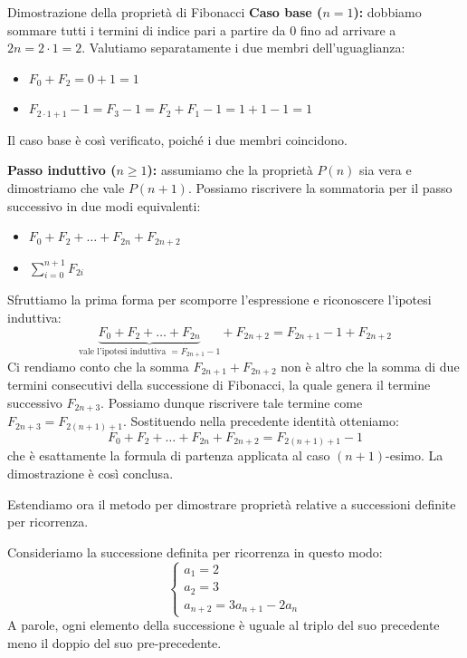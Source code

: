 \documentclass[12pt]{report}
\begin{document}
	\begin{dimostrazione}{Dimostrazione della proprietà di Fibonacci}{}
		\textbf{Caso base ($n=1$):} dobbiamo sommare tutti i termini di indice pari a partire da $0$ fino ad arrivare a $2n = 2\cdot 1 = 2$.
		Valutiamo separatamente i due membri dell'uguaglianza:
		\begin{itemize}
			\item $F_0 + F_2 = 0 + 1 = 1$
			\item $F_{2\cdot 1 + 1} - 1 = F_3 - 1 = F_2 + F_1 - 1 = 1 + 1 - 1 = 1$
		\end{itemize}
		Il caso base è così verificato, poiché i due membri coincidono.
		
		\textbf{Passo induttivo ($n \ge 1$):} assumiamo che la proprietà $P(n)$ sia vera e dimostriamo che vale $P(n+1)$.
		Possiamo riscrivere la sommatoria per il passo successivo in due modi equivalenti:
		\begin{itemize}
			\item $F_0 + F_2 + \dots + F_{2n} + F_{2n+2}$
			\item $\sum_{i=0}^{n+1} F_{2i}$
		\end{itemize}
		Sfruttiamo la prima forma per scomporre l'espressione e riconoscere l'ipotesi induttiva:
		\[
		\underbrace{F_0 + F_2 + \dots + F_{2n}}_{\text{vale l'ipotesi induttiva } = F_{2n+1} - 1} + F_{2n+2} = F_{2n+1} - 1 + F_{2n+2}
		\]
		Ci rendiamo conto che la somma $F_{2n+1} + F_{2n+2}$ non è altro che la somma di due termini consecutivi della successione di Fibonacci, la quale genera il termine successivo $F_{2n+3}$.
		Possiamo dunque riscrivere tale termine come $F_{2n+3} = F_{2(n+1)+1}$. Sostituendo nella precedente identità otteniamo:
		\[
		F_0 + F_2 + \dots + F_{2n} + F_{2n+2} = F_{2(n+1)+1} - 1
		\]
		che è esattamente la formula di partenza applicata al caso $(n+1)$-esimo. La dimostrazione è così conclusa.
	\end{dimostrazione}
	
	Estendiamo ora il metodo per dimostrare proprietà relative a successioni definite per ricorrenza.
	
	Consideriamo la successione definita per ricorrenza in questo modo:
	\[
	\begin{cases}
		a_1 = 2 \\
		a_2 = 3 \\
		a_{n+2} = 3a_{n+1} - 2a_n
	\end{cases}
	\]
	A parole, ogni elemento della successione è uguale al triplo del suo precedente meno il doppio del suo pre-precedente.
	
\end{document}

